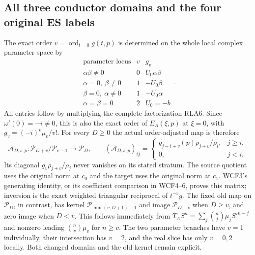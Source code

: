 \documentclass[11pt]{article}
\begin{document}
\subsection{All three conductor domains and the four original ES labels}

The exact order $v=\operatorname{ord}_{t=0}g(t,p)$ is determined
on the whole local complex parameter space by
\[
\begin{array}{c|c|c}
 \text{parameter locus}&v&g_v\\\hline
 \alpha\beta\ne0&0&U_0\alpha\beta\\
 \alpha=0,\ \beta\ne0&1&-U_0\beta\\
 \beta=0,\ \alpha\ne0&1&-U_0\alpha\\
 \alpha=\beta=0&2&U_0=-b
\end{array}.
 \tag{RLA29}
\]
All entries follow by multiplying the complete factorization RLA6.
Since $\omega'(0)=-i\ne0$, this is also the exact order of
$E_A(\xi,p)$ at $\xi=0$, with $g_v=(-i)^v\mu_v/v!$.
For every $D\ge0$ the actual order-adjusted map is therefore
\[
 \mathcal A_{D,s,p}:\mathcal P_{D+v}/\mathcal P_{v-1}
       \longrightarrow\mathcal P_D,\qquad
 (\mathcal A_{D,s,p})_{ij}=
 \begin{cases}g_{j-i+v}(p)\rho_{j+v}/\rho_i,&j\ge i,\\0,&j<i.
 \end{cases}
 \tag{RLA30}
\]
Its diagonal $g_v\rho_{j+v}/\rho_j$ never vanishes on its stated
stratum.  The source quotient uses the original norm at $c_0$ and
the target uses the original norm at $c_1$.  WCF3's generating
identity, or its coefficient comparison in WCF4--6, proves this
matrix; inversion is the exact weighted triangular reciprocal of
$t^{-v}g$.  The fixed old map on $\mathcal P_D$, in contrast, has
kernel $\mathcal P_{\min(v,D+1)-1}$ and image
$\mathcal P_{D-v}$ when $D\ge v$, and zero image when $D<v$.
This follows immediately from
$T_AS^n=\sum_j\binom nj\mu_jS'^{n-j}$ and nonzero leading
$\binom nv\mu_v$ for $n\ge v$.
The two parameter branches have $v=1$ individually, their
intersection has $v=2$, and the real slice has only $v=0,2$ locally.
Both changed domains and the old kernel remain explicit.
\end{document}
